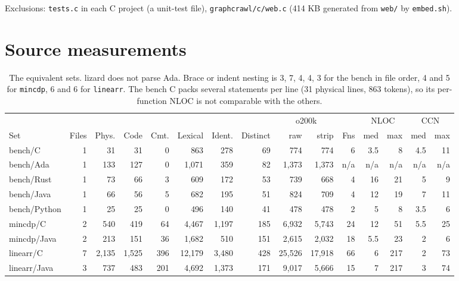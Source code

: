\documentclass[11pt,a4paper]{article}
\begin{document}
Exclusions: \texttt{tests.c} in each C project (a unit-test file), \texttt{graphcrawl/c/web.c} (414 KB generated from \texttt{web/} by \texttt{embed.sh}).

\section{Source measurements}

\begin{table}[H]
\centering
\scriptsize
\setlength{\tabcolsep}{3pt}
\begin{tabular}{lrrrrrrrrrrrrrr}
\toprule
& & & & & & & & \multicolumn{2}{c}{o200k} & & \multicolumn{2}{c}{NLOC} & \multicolumn{2}{c}{CCN} \\
\cmidrule(lr){9-10} \cmidrule(lr){12-13} \cmidrule(lr){14-15}
Set & Files & Phys. & Code & Cmt. & Lexical & Ident. & Distinct & raw & strip & Fns & med & max & med & max \\
\midrule
bench/C & 1 & 31 & 31 & 0 & 863 & 278 & 69 & 774 & 774 & 6 & 3.5 & 8 & 4.5 & 11 \\
bench/Ada & 1 & 133 & 127 & 0 & 1,071 & 359 & 82 & 1,373 & 1,373 & n/a & n/a & n/a & n/a & n/a \\
bench/Rust & 1 & 73 & 66 & 3 & 609 & 172 & 53 & 739 & 668 & 4 & 16 & 21 & 5 & 9 \\
bench/Java & 1 & 66 & 56 & 5 & 682 & 195 & 51 & 824 & 709 & 4 & 12 & 19 & 7 & 11 \\
bench/Python & 1 & 25 & 25 & 0 & 496 & 140 & 41 & 478 & 478 & 2 & 5 & 8 & 3.5 & 6 \\
\addlinespace
mincdp/C & 2 & 540 & 419 & 64 & 4,467 & 1,197 & 185 & 6,932 & 5,743 & 24 & 12 & 51 & 5.5 & 25 \\
mincdp/Java & 2 & 213 & 151 & 36 & 1,682 & 510 & 151 & 2,615 & 2,032 & 18 & 5.5 & 23 & 2 & 6 \\
\addlinespace
linearr/C & 7 & 2,135 & 1,525 & 396 & 12,179 & 3,480 & 428 & 25,526 & 17,918 & 66 & 6 & 217 & 2 & 73 \\
linearr/Java & 3 & 737 & 483 & 201 & 4,692 & 1,373 & 171 & 9,017 & 5,666 & 15 & 7 & 217 & 3 & 74 \\
\bottomrule
\end{tabular}
\caption{The equivalent sets. lizard does not parse Ada. Brace or indent nesting is 3, 7, 4, 4, 3 for the bench in file order, 4 and 5 for \texttt{mincdp}, 6 and 6 for \texttt{linearr}. The bench C packs several statements per line (31 physical lines, 863 tokens), so its per-function NLOC is not comparable with the others.}
\label{tab:size}
\end{table}
\end{document}

